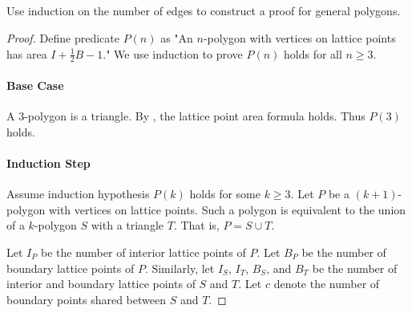\documentclass{article}
\begin{document}
\subsection*{}%
%

Use induction on the number of edges to construct a proof for general polygons.

\begin{proof}

  Define predicate $P(n)$ as "An $n$-polygon with vertices on lattice points has
    area $I + \frac{1}{2}B - 1$."
  We use induction to prove $P(n)$ holds for all $n \geq 3$.

  \paragraph{Base Case}%

    A $3$-polygon is a triangle.
    By , the lattice point area formula holds.
    Thus $P(3)$ holds.

  \paragraph{Induction Step}%

    Assume induction hypothesis $P(k)$ holds for some $k \geq 3$.
    Let $P$ be a $(k + 1)$-polygon with vertices on lattice points.
    Such a polygon is equivalent to the union of a $k$-polygon $S$ with a
      triangle $T$.
    That is, $P = S \cup T$.

    Let $I_P$ be the number of interior lattice points of $P$.
    Let $B_P$ be the number of boundary lattice points of $P$.
    Similarly, let $I_S$, $I_T$, $B_S$, and $B_T$ be the number of interior
      and boundary lattice points of $S$ and $T$.
    Let $c$ denote the number of boundary points shared between $S$ and $T$.


\end{proof}
\end{document}
